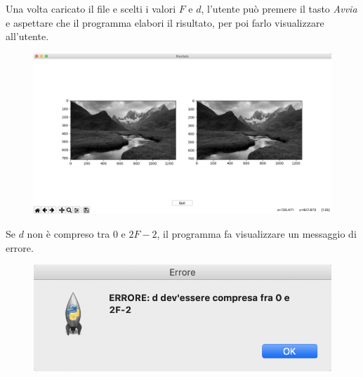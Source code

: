 \documentclass[preprint,12pt]{elsarticle}
\begin{document}
\begin{description}
Una volta caricato il file e scelti i valori $F$ e $d$, l'utente può premere il tasto \textit{Avvia} e aspettare che il programma elabori il risultato, per poi farlo visualizzare all'utente.

\begin{figure}[H]
	\centering
	\includegraphics[width=1\linewidth]{risultato}
\end{figure}

Se $d$ non è compreso tra $0$ e $2F-2$, il programma fa visualizzare un messaggio di errore.
\begin{figure}[H]
	\centering
	\includegraphics[width=0.55\linewidth]{errore}
\end{figure}
\end{description}

	
\end{document}
